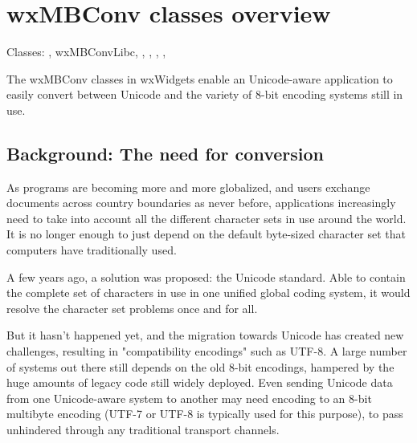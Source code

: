 
\section{wxMBConv classes overview}\label{mbconvclasses}

Classes: , wxMBConvLibc, 
, , 
, 
, 

The wxMBConv classes in wxWidgets enable an Unicode-aware application to
easily convert between Unicode and the variety of 8-bit encoding systems still
in use.

\subsection{Background: The need for conversion}\label{needforconversion}

As programs are becoming more and more globalized, and users exchange documents
across country boundaries as never before, applications increasingly need to
take into account all the different character sets in use around the world. It
is no longer enough to just depend on the default byte-sized character set that
computers have traditionally used.

A few years ago, a solution was proposed: the Unicode standard. Able to contain
the complete set of characters in use in one unified global coding system,
it would resolve the character set problems once and for all.

But it hasn't happened yet, and the migration towards Unicode has created new
challenges, resulting in "compatibility encodings" such as UTF-8. A large
number of systems out there still depends on the old 8-bit encodings, hampered
by the huge amounts of legacy code still widely deployed. Even sending
Unicode data from one Unicode-aware system to another may need encoding to an
8-bit multibyte encoding (UTF-7 or UTF-8 is typically used for this purpose), to
pass unhindered through any traditional transport channels.

